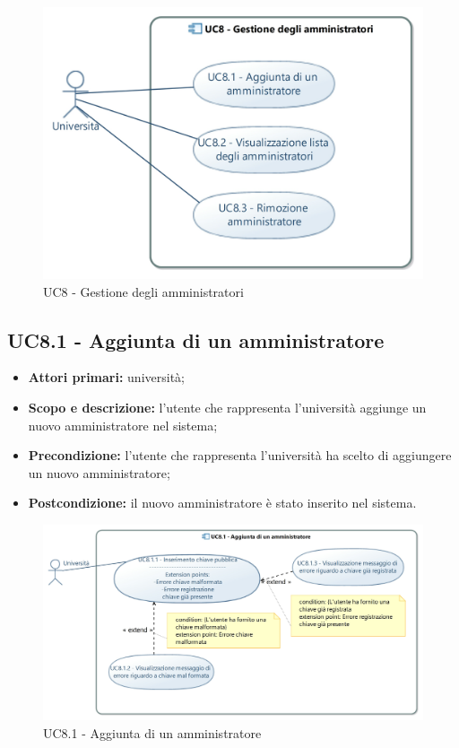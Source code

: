 \documentclass[AnalisiDeiRequisiti.tex]{subfiles}
\begin{document}
\begin{figure}[H]
	\centering
	\includegraphics[width=1.0\linewidth]{UC8.jpg}
	\caption{UC8 - Gestione degli amministratori}
	\label{fig:UC8 - Gestione degli amministratori}
\end{figure}

\subsection{UC8.1 - Aggiunta di un amministratore}
\begin{itemize}
	\item \textbf{Attori primari:} università;
	\item \textbf{Scopo e descrizione:} l'utente che rappresenta l'università aggiunge un nuovo amministratore nel sistema;
	\item \textbf{Precondizione:} l'utente che rappresenta l'università ha scelto di aggiungere un nuovo amministratore; 
	\item \textbf{Postcondizione:} il nuovo amministratore è stato inserito nel sistema.
\end{itemize}

\begin{figure}[H]
	\centering
	\includegraphics[width=1.0\linewidth]{UC8_1.jpg}
	\caption{UC8.1 - Aggiunta di un amministratore}
	\label{fig:UC8.1 - Aggiunta di un amministratore}
\end{figure}
\end{document}
